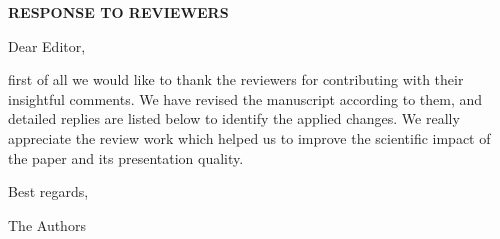\documentclass[11pt, technote, letterpaper, oneside, onecolumn]{IEEEtran}
\begin{document}
\newcommand\tabnode[1]{\addtocounter{nodecount}{1}\tikz \node (\arabic{nodecount}) {#1};}

\textbf{RESPONSE TO REVIEWERS}


\vspace{+2\baselineskip}

\noindent Dear Editor,

\vspace{+0.1\baselineskip}

first of all we would like to thank the reviewers for contributing with their insightful comments. We have revised the manuscript according to them, and detailed replies are listed below to identify the applied changes.  We really appreciate the review work which helped us to improve the scientific impact of the paper and its presentation quality. 
\vspace{+0.5\baselineskip}

\noindent Best regards,

\vspace{+0.1\baselineskip}

The Authors

\vspace{+3\baselineskip}


\newpage
\end{document}
